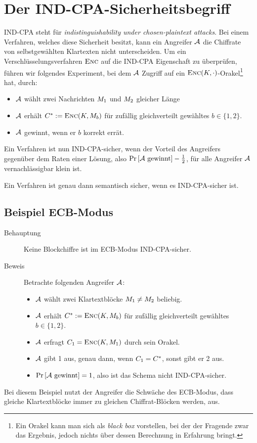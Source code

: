 \section{Der IND-CPA-Sicherheitsbegriff}\label{def:ind-cpa}
IND-CPA steht für \emph{indistinguishability under chosen-plaintext attacks}. Bei einem Verfahren, welches diese Sicherheit besitzt, kann ein Angreifer $\mathcal{A}$
die Chiffrate von selbstgewählten Klartexten nicht unterscheiden. Um ein Verschlüsselungsverfahren $\textsc{Enc}$ auf die IND-CPA Eigenschaft zu überprüfen, führen wir folgendes Experiment, bei dem $\mathcal{A}$ Zugriff auf ein $\textsc{Enc}(K,\cdot)$-Orakel\footnote{Ein Orakel kann man sich als \textit{black box} vorstellen, bei der der Fragende zwar das Ergebnis, jedoch nichts über dessen Berechnung in Erfahrung bringt.} hat, durch:
\begin{itemize}
\item $\mathcal{A}$ wählt zwei Nachrichten $M_1$ und $M_2$ gleicher Länge
\item $\mathcal{A}$ erhält $C^{*} := \textsc{Enc}(K, M_{b})$ für zufällig gleichverteilt gewähltes $b \in \{1, 2\}$.
\item $\mathcal{A}$ gewinnt, wenn er $b$ korrekt errät.
\end{itemize}
Ein Verfahren ist nun IND-CPA-sicher, wenn der Vorteil des Angreifers gegenüber dem Raten einer Lösung, also $\Pr \left[ \mathcal{A} \text{
gewinnt} \right] - \frac{1}{2}$, für alle Angreifer $\mathcal{A}$ vernachlässigbar klein ist. 
\begin{theorem}
Ein Verfahren ist genau dann semantisch sicher, wenn es IND-CPA-sicher ist.
\end{theorem}

\subsection{Beispiel ECB-Modus}
\begin{description} 
	\item[Behauptung] Keine Blockchiffre ist im ECB-Modus IND-CPA-sicher.
	\item[Beweis] Betrachte folgenden Angreifer $\mathcal{A}$:
	\begin{itemize}
		\item $\mathcal{A}$ wählt zwei Klartextblöcke $M_1 \neq M_2$ beliebig.
		\item $\mathcal{A}$ erhält  $C^{*} := \textsc{Enc}(K, M_{b})$ für zufällig gleichverteilt gewähltes $b \in \{1, 2\}$.
		\item $\mathcal{A}$ erfragt $C_1 = \textsc{Enc}(K, M_1)$ durch sein Orakel.
		\item $\mathcal{A}$ gibt 1 aus, genau dann, wenn $C_1 = C^{*}$, sonst gibt er 2 aus.
		\item $\Pr \left[ \mathcal{A} \text{ gewinnt} \right] = 1$, also ist das Schema nicht IND-CPA-sicher.
	\end{itemize}
\end{description}
Bei diesem Beispiel nutzt der Angreifer die Schwäche des ECB-Modus, dass gleiche Klartextblöcke immer zu gleichen Chiffrat-Blöcken werden, aus.

